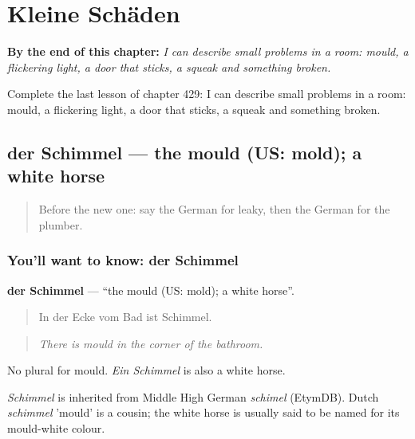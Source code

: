 
\chapter{Kleine Schäden}
\label{ch:ge-kleine-schaden}

\begin{chapteropening}
\textbf{By the end of this chapter:} \emph{I can describe small problems in a room: mould, a flickering light, a door that sticks, a squeak and something broken.}

Complete the last lesson of chapter 429: I can describe small problems in a room: mould, a flickering light, a door that sticks, a squeak and something broken.
\end{chapteropening}

\section[der Schimmel]{der Schimmel — the mould (US: mold); a white horse}

\label{lesson:GE-C429-schimmel}



\begin{quote}
Before the new one: say the German for leaky, then the German for the plumber.
\end{quote}

\subsection*{You'll want to know: der Schimmel}
\textbf{der Schimmel} — \textquotedblleft{}the mould (US: mold); a white horse\textquotedblright{}.

\begin{quote}
In der Ecke vom Bad ist Schimmel.
\end{quote}

\begin{quote}
\emph{There is mould in the corner of the bathroom.}
\end{quote}

No plural for mould. \emph{Ein Schimmel} is also a white horse.

\begin{cousinweb}
\emph{Schimmel} is inherited from Middle High German \emph{schimel} (EtymDB). Dutch \emph{schimmel} 'mould' is a cousin; the white horse is usually said to be named for its mould-white colour.
\end{cousinweb}

